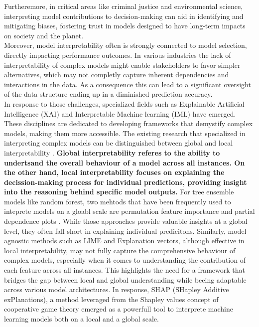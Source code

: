 \documentclass[12pt]{article}
\begin{document}
 Furtheremore, in critical areas like criminal justice and environmental science, interpreting model contributions to decision-making can aid in identifying and mitigating biases, fostering trust in models designed to have long-term impacts on society and the planet.\\
 Moreover, model interpretability often is strongly connected to model selection, directly impacting performance outcomes.
In various industries the lack of interpretability of complex models  might enable stakeholders to favor simpler alternatives, which may not completly capture inherent dependencies and interactions in the data.
As a consequence this can lead to a significant oversight of the data structure ending up in a diminished prediction accuracy. \\
In response to those challenges, specialized fields such as Explainable Artificial Intelligence (XAI) and Interpretable Machine learning (IML) have emerged.
These disciplines are dedicated to developing frameworks that demystify complex models, making them more accessible. 
The existing research that specialized in interpreting complex models can be distinguished between global and local interpretability \cite{molnar2022}. \textbf{Global interpretability referes to the ability to undertsand the overall behaviour of a model across all instances. On the other hand, local interpretability focuses on explaining the decission-making process for individual predictions, providing insight into the reasoning behind specific model outputs. }
For tree ensemble models like random forest, two mehtods that have been frequently used to inteprete models on a gloabl scale are permutation feature importance \cite{article} and partial dependence plots \cite{4a848dd1-54e3-3c3c-83c3-04977ded2e71}. 
While those approaches provide valuable insights at a global level, they often fall short in explaining individual predicitons.
Similarly, model agnostic methods such as LIME \cite{10.1145/2939672.2939778} and Explanation vectors, although effective in local interpretability, may not fully capture the comprehensive behaviour of complex models, especially when it comes to understanding the contribution of each feature across all instances.
 This highlights the need for a framework that bridges the gap between local and global understanding while beeing adaptable across various model architectures. 
In response, SHAP (SHapley Additive exPlanations), a method leveraged from the Shapley values concept of cooperative game theory emerged as a powerfull tool to interprete machine learning models both on a local and a global scale. 
\end{document}
